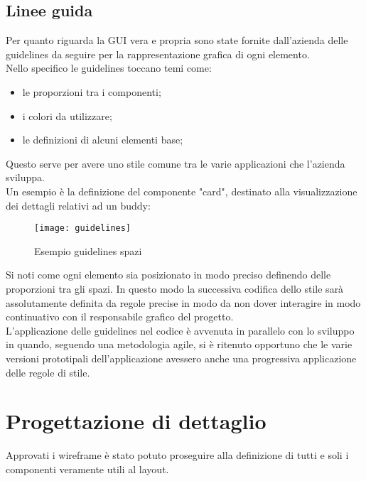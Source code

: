 \subsection{Linee guida}
Per quanto riguarda la GUI vera e propria sono state fornite dall'azienda delle 
guidelines da seguire per la rappresentazione grafica di ogni elemento. \\
Nello specifico le guidelines toccano temi come:
\begin{itemize}
	\item le proporzioni tra i componenti;
	\item i colori da utilizzare;
	\item le definizioni di alcuni elementi base;
\end{itemize}
Questo serve per avere uno stile comune tra le varie applicazioni che 
l'azienda sviluppa. \\
Un esempio è la definizione del componente "card", destinato alla 
visualizzazione dei dettagli relativi ad un buddy:
\begin{figure}[H] 
	\centering
	\texttt{[image: guidelines]}
	\caption{Esempio guidelines spazi}
\end{figure}
Si noti come ogni elemento sia posizionato in modo preciso definendo delle 
proporzioni tra gli spazi. In questo modo la successiva codifica dello stile sarà 
assolutamente definita da regole precise in modo da non dover interagire in modo 
continuativo con il responsabile grafico del progetto. \\
L'applicazione delle guidelines nel codice è avvenuta in parallelo con lo sviluppo 
in quando, seguendo una metodologia agile, si è ritenuto opportuno che le varie 
versioni prototipali dell'applicazione avessero anche una progressiva applicazione 
delle regole di stile.

\section{Progettazione di dettaglio}
Approvati i wireframe è stato potuto proseguire alla definizione di tutti 
e soli i componenti veramente utili al layout.